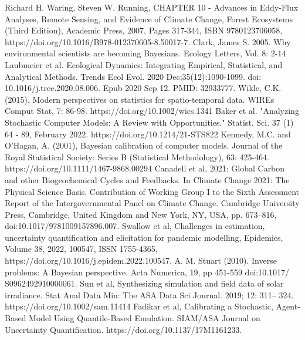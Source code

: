 \documentclass[12pt]{article}
\begin{document}
\begin{thebibliography}{20}
 Richard H. Waring, Steven W. Running, CHAPTER 10 - Advances in Eddy-Flux Analyses, Remote Sensing, and Evidence of Climate Change, Forest Ecosystems (Third Edition), Academic Press, 2007, Pages 317-344, ISBN 9780123706058, https://doi.org/10.1016/B978-012370605-8.50017-7.
 Clark, James S. 2005. Why environmental scientists are becoming Bayesians. Ecology Letters, Vol. 8: 2-14
 Laubmeier et al. Ecological Dynamics: Integrating Empirical, Statistical, and Analytical Methods. Trends Ecol Evol. 2020 Dec;35(12):1090-1099. doi: 10.1016/j.tree.2020.08.006. Epub 2020 Sep 12. PMID: 32933777.
 Wikle, C.K. (2015), Modern perspectives on statistics for spatio-temporal data. WIREs Comput Stat, 7: 86-98. https://doi.org/10.1002/wics.1341
 Baker et al. "Analyzing Stochastic Computer Models: A Review with Opportunities." Statist. Sci. 37 (1) 64 - 89, February 2022. https://doi.org/10.1214/21-STS822
 Kennedy, M.C. and O'Hagan, A. (2001), Bayesian calibration of computer models. Journal of the Royal Statistical Society: Series B (Statistical Methodology), 63: 425-464. https://doi.org/10.1111/1467-9868.00294
 Canadell et al, 2021: Global Carbon and
other Biogeochemical Cycles and Feedbacks. In Climate Change 2021: The Physical Science Basis. Contribution of
Working Group I to the Sixth Assessment Report of the Intergovernmental Panel on Climate Change. Cambridge University Press,
Cambridge, United Kingdom and New York, NY, USA, pp. 673–816, doi:10.1017/9781009157896.007.
 Swallow et al, Challenges in estimation, uncertainty quantification and elicitation for pandemic modelling, Epidemics, Volume 38, 2022, 100547, ISSN 1755-4365, https://doi.org/10.1016/j.epidem.2022.100547.
 A. M. Stuart (2010). Inverse problems: A Bayesian perspective. Acta Numerica, 19, pp 451-559 doi:10.1017/
S0962492910000061.
 Sun et al, Synthesizing simulation and field data of solar irradiance. Stat Anal Data Min: The ASA Data Sci Journal. 2019; 12: 311– 324. https://doi.org/10.1002/sam.11414
 Fadikar et al, Calibrating a Stochastic, Agent-Based Model Using Quantile-Based Emulation. SIAM/ASA Journal on Uncertainty Quantification. https://doi.org/10.1137/17M1161233.

\end{thebibliography}
\end{document}
